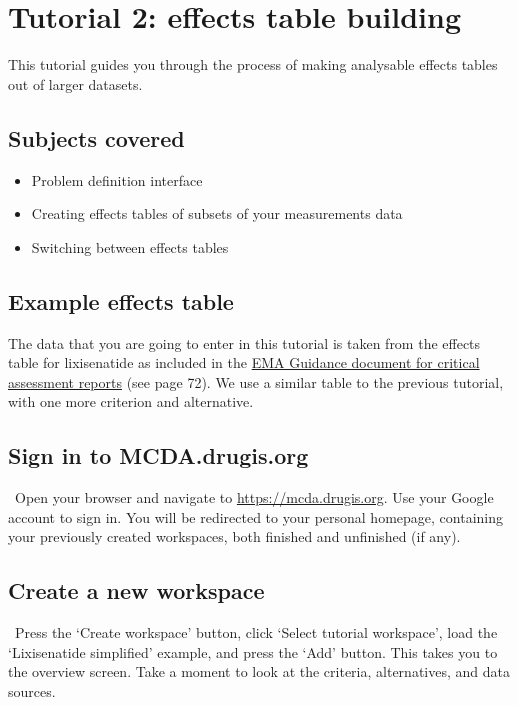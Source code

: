 \documentclass[00_mcda_tutorial.tex]{subfiles}
\begin{document}
\section*{Tutorial 2: effects table building}
\addtocounter{section}{1}

This tutorial guides you through the process of making analysable effects tables out of larger datasets.

\subsection*{Subjects covered}
\begin{itemize}
\item Problem definition interface
\item Creating effects tables of subsets of your measurements data
\item Switching between effects tables
\end{itemize}

\subsection*{Example effects table}
The data that you are going to enter in this tutorial is taken from the effects table for lixisenatide as included in the \href{https://www.ema.europa.eu/documents/template-form/day-80-assessment-report-overview-d120-loq-template-guidance-rev-0718_en.doc}{EMA Guidance document for critical assessment reports} (see page 72). We use a similar table to the previous tutorial, with one more criterion and alternative.

\subsection*{Sign in to MCDA.drugis.org}
\leftpointright \, Open your browser and navigate to \href{https://mcda.drugis.org}{https://mcda.drugis.org}. Use your Google account to sign in. You will be redirected to your personal homepage, containing your previously created workspaces, both finished and unfinished (if any).

\subsection*{Create a new workspace}
\leftpointright \, Press the ‘Create workspace’ button, click ‘Select tutorial workspace’, load the ‘Lixisenatide simplified’ example, and press the ‘Add’ button. This takes you to the overview screen. Take a moment to look at the criteria, alternatives, and data sources.
\end{document}
